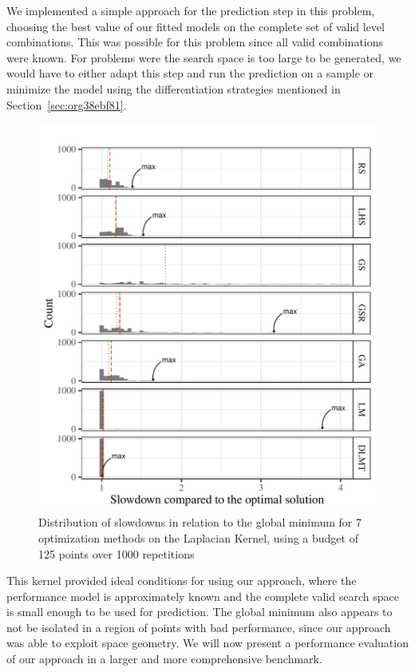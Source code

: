 \documentclass[conference]{IEEEtran}
\begin{document}
We  implemented a  simple  approach for  the prediction  step  in this  problem,
choosing the best value of our fitted  models on the complete set of valid level
combinations. This  was possible for  this problem since all  valid combinations
were known. For problems were the search  space is too large to be generated, we
would have  to either  adapt this  step and run  the prediction  on a  sample or
minimize   the  model   using  the   differentiation  strategies   mentioned  in
Section~\ref{sec:org38ebf81}.

\begin{figure}[t]\vspace{-.5cm}
\centering
\includegraphics[width=.9\columnwidth]{./img/comparison_histogram.pdf}
\caption{\label{fig:orgbd55b63}
Distribution of slowdowns in relation to the global minimum for 7 optimization methods on the Laplacian Kernel, using a budget of 125 points over 1000 repetitions \vspace{-.5cm}}
\end{figure}

This  kernel  provided  ideal  conditions  for using  our  approach,  where  the
performance model is approximately known and  the complete valid search space is
small enough to be  used for prediction. The global minimum  also appears to not
be isolated in a  region of points with bad performance,  since our approach was
able to exploit space geometry. We  will now present a performance evaluation of
our approach in a larger and more comprehensive benchmark.
\end{document}

